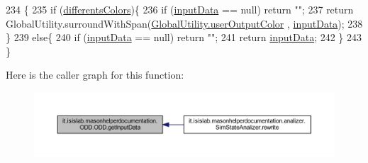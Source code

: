 \begin{DoxyCode}
234                                        \{
235         \textcolor{keywordflow}{if} (\hyperlink{classit_1_1isislab_1_1masonhelperdocumentation_1_1_o_d_d_1_1_o_d_d_ab09b176537cd5e168d67fc16112444dc}{differentsColors})\{
236             \textcolor{keywordflow}{if} (\hyperlink{classit_1_1isislab_1_1masonhelperdocumentation_1_1_o_d_d_1_1_o_d_d_a003e2cc245212d81de91896a8ce4f440}{inputData} == null) \textcolor{keywordflow}{return} \textcolor{stringliteral}{""};
237             \textcolor{keywordflow}{return} GlobalUtility.surroundWithSpan(\hyperlink{classit_1_1isislab_1_1masonhelperdocumentation_1_1analizer_1_1_global_utility_aec864cd710b27ece609c5a6093211ff4}{GlobalUtility.userOutputColor}
      , \hyperlink{classit_1_1isislab_1_1masonhelperdocumentation_1_1_o_d_d_1_1_o_d_d_a003e2cc245212d81de91896a8ce4f440}{inputData});
238         \}
239         \textcolor{keywordflow}{else}\{
240             \textcolor{keywordflow}{if} (\hyperlink{classit_1_1isislab_1_1masonhelperdocumentation_1_1_o_d_d_1_1_o_d_d_a003e2cc245212d81de91896a8ce4f440}{inputData} == null) \textcolor{keywordflow}{return} \textcolor{stringliteral}{""};
241             \textcolor{keywordflow}{return} \hyperlink{classit_1_1isislab_1_1masonhelperdocumentation_1_1_o_d_d_1_1_o_d_d_a003e2cc245212d81de91896a8ce4f440}{inputData};
242         \}
243     \}
\end{DoxyCode}


Here is the caller graph for this function\-:\nopagebreak
\begin{figure}[H]
\begin{center}
\leavevmode
\includegraphics[width=350pt]{classit_1_1isislab_1_1masonhelperdocumentation_1_1_o_d_d_1_1_o_d_d_adf8e82ba7854afdc0790d3b3032b930c_icgraph}
\end{center}
\end{figure}


